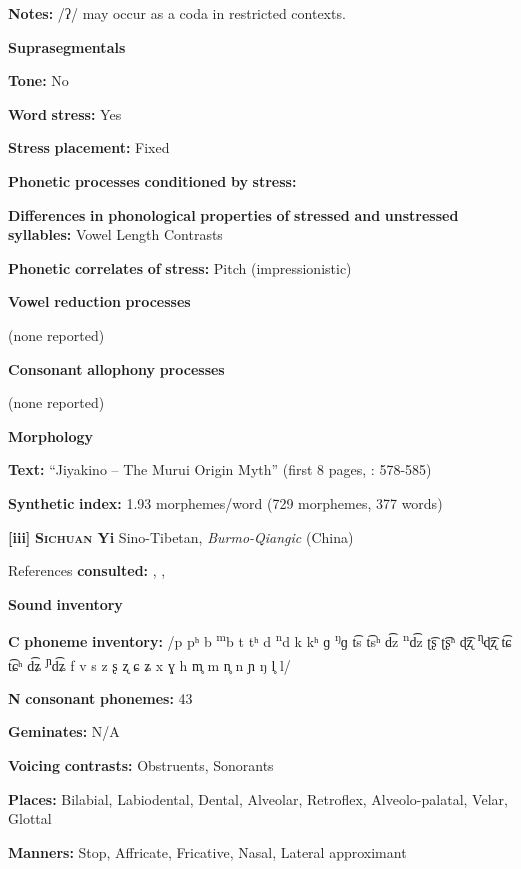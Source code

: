 \textbf{Notes:} /ʔ/ may occur as a coda in restricted contexts.

\textbf{Suprasegmentals}

\textbf{Tone:} No

\textbf{Word} \textbf{stress:} Yes

\textbf{Stress} \textbf{placement:} Fixed

\textbf{Phonetic} \textbf{processes} \textbf{conditioned} \textbf{by} \textbf{stress:}

\textbf{Differences} \textbf{in} \textbf{phonological} \textbf{properties} \textbf{of} \textbf{stressed} \textbf{and} \textbf{unstressed} \textbf{syllables:} Vowel Length Contrasts

\textbf{Phonetic} \textbf{correlates} \textbf{of} \textbf{stress:} Pitch (impressionistic)

\textbf{Vowel} \textbf{reduction} \textbf{processes}

(none reported)

\textbf{Consonant} \textbf{allophony} \textbf{processes}

(none reported)

\textbf{Morphology}

\textbf{Text:} “Jiyakino -- The Murui Origin Myth” (first 8 pages, \citealt{Wojtylak2017}: 578-585)

\textbf{Synthetic} \textbf{index:} 1.93 morphemes/word (729 morphemes, 377 words)

\textbf{[iii]}   \textbf{\textsc{Sichuan} \textbf{Yi}}  Sino-Tibetan, \textit{Burmo-Qiangic} (China)

References \textbf{consulted:} \citet{Gerner2013}, \citet{Maoji1997}, \citet{Merrifield2012}

\textbf{Sound} \textbf{inventory}

\textbf{C} \textbf{phoneme} \textbf{inventory:} /p pʰ b \textsuperscript{m}b t tʰ d \textsuperscript{n}d k kʰ ɡ \textsuperscript{ŋ}ɡ t͡s t͡sʰ d͡z \textsuperscript{n}d͡z ʈ͡ʂ ʈ͡ʂʰ ɖ͡ʐ \textsuperscript{ɳ}ɖ͡ʐ t͡ɕ t͡ɕʰ d͡ʑ \textsuperscript{ɲ}d͡ʑ f v s z ʂ ʐ ɕ ʑ x ɣ h m̥ m n̥ n ɲ ŋ l̥ l/

\textbf{N} \textbf{consonant} \textbf{phonemes:} 43

\textbf{Geminates:} N/A

\textbf{Voicing} \textbf{contrasts:} Obstruents, Sonorants

\textbf{Places:} Bilabial, Labiodental, Dental, Alveolar, Retroflex, Alveolo-palatal, Velar, Glottal

\textbf{Manners:} Stop, Affricate, Fricative, Nasal, Lateral approximant

